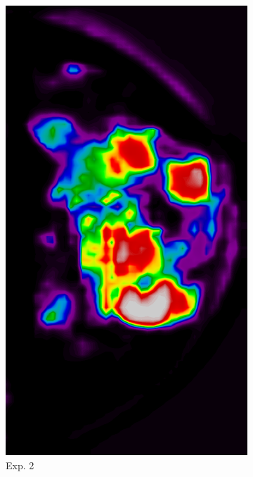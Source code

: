\documentclass{beamer}
\begin{document}
\begin{frame}
\begin{figure}
\begin{subfigure}{0.134\textwidth}
		            \includegraphics[width=\textwidth]{plots/examples/example5_probs_2.png}
	            \caption*{\footnotesize Exp. 2}
            \end{subfigure}
            \begin{subfigure}{0.134\textwidth}
	            \centering

\end{subfigure}
\end{figure}
\end{frame}
\end{document}

